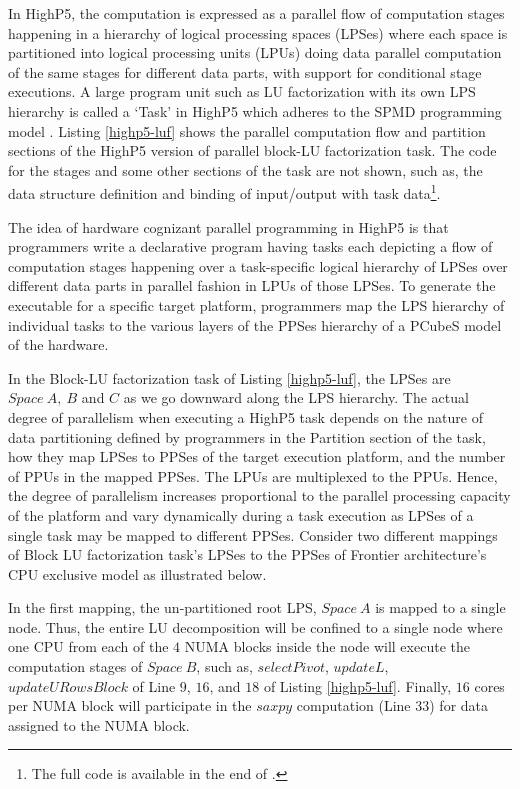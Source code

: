 \documentclass[ASNA,twocolumn]{USG} %
\begin{document}
{In HighP5, the computation is expressed as a parallel flow of computation stages happening in a hierarchy of logical processing spaces (LPSes) where each space is partitioned into logical processing units (LPUs) doing data parallel computation of the same stages for different data parts, with support for conditional stage executions. A large program unit such as LU factorization with its own LPS hierarchy is called a `Task' in HighP5 which adheres to the SPMD programming model \citep{kamil2013hierarchical}. Listing \ref{highp5-luf} shows the parallel computation flow and partition sections of the HighP5 version of parallel block-LU factorization task. The code for the stages and some other sections of the task are not shown, such as, the data structure definition and binding of input/output with task data\footnote{The full code is available in the end of \cite{yanhaona2024highp5}.}. 



The idea of hardware cognizant parallel programming in HighP5 is that programmers write a declarative program having tasks each depicting a flow of computation stages happening over a task-specific logical hierarchy of LPSes over different data parts in parallel fashion in LPUs of those LPSes. To generate the executable for a specific target platform, programmers map the LPS hierarchy of individual tasks to the various layers of the PPSes hierarchy of a PCubeS model of the hardware. 

In the Block-LU factorization task of Listing \ref{highp5-luf}, the LPSes are $Space\ A,\ B$ and $C$ as we go downward along the LPS hierarchy. The actual degree of parallelism when executing a HighP5 task depends on the nature of data partitioning defined by programmers in the Partition section of the task, how they map LPSes to PPSes of the target execution platform, and the number of PPUs in the mapped PPSes. The LPUs are multiplexed to the PPUs. Hence, the degree of parallelism increases proportional to the parallel processing capacity of the platform and vary dynamically during a task execution as LPSes of a single task may be mapped to different PPSes. Consider two different mappings of Block LU factorization task's LPSes to the PPSes of Frontier architecture's CPU exclusive model as illustrated below.




In the first mapping, the un-partitioned root LPS, $Space\ A$ is mapped to a single node. Thus, the entire LU decomposition will be confined to a single node where one CPU from each of the $4$ NUMA blocks inside the node will execute the computation stages of $Space\ B$, such as, $selectPivot$, $updateL$, $updateURowsBlock$ of Line $9$, $16$, and $18$ of Listing \ref{highp5-luf}. Finally, $16$ cores per NUMA block will participate in the $saxpy$ computation (Line $33$) for data assigned to the NUMA block.

}
\end{document}
